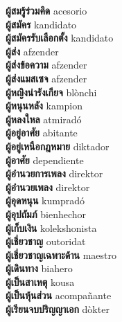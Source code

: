 \textbf{ ผู้สมรู้ร่วมคิด  } acesorio \\
\textbf{ ผู้สมัคร  } kandidato \\
\textbf{ ผู้สมัครรับเลือกตั้ง  } kandidato \\
\textbf{ ผู้ส่ง  } afzender \\
\textbf{ ผู้ส่งข้อความ  } afzender \\
\textbf{ ผู้ส่งแมสเซจ  } afzender \\
\textbf{ ผู้หญิงน่ารังเกียจ  } blònchi \\
\textbf{ ผู้หนุนหลัง  } kampion \\
\textbf{ ผู้หลงใหล  } atmiradó \\
\textbf{ ผู้อยู่อาศัย  } abitante \\
\textbf{ ผู้อยู่เหนือกฎหมาย  } diktador \\
\textbf{ ผู้อาศัย  } dependiente \\
\textbf{ ผู้อำนวยการเพลง  } direktor \\
\textbf{ ผู้อำนวยเพลง  } direktor \\
\textbf{ ผู้อุดหนุน  } kumpradó \\
\textbf{ ผู้อุปถัมภ์  } bienhechor \\
\textbf{ ผู้เก็บเงิน  } kolekshonista \\
\textbf{ ผู้เชี่ยวชาญ  } outoridat \\
\textbf{ ผู้เชี่ยวชาญเฉพาะด้าน  } maestro \\
\textbf{ ผู้เดินทาง  } biahero \\
\textbf{ ผู้เป็นสาเหตุ  } kousa \\
\textbf{ ผู้เป็นหุ้นส่วน  } acompañante \\
\textbf{ ผู้เรียนจบปริญญาเอก  } dòkter \\
